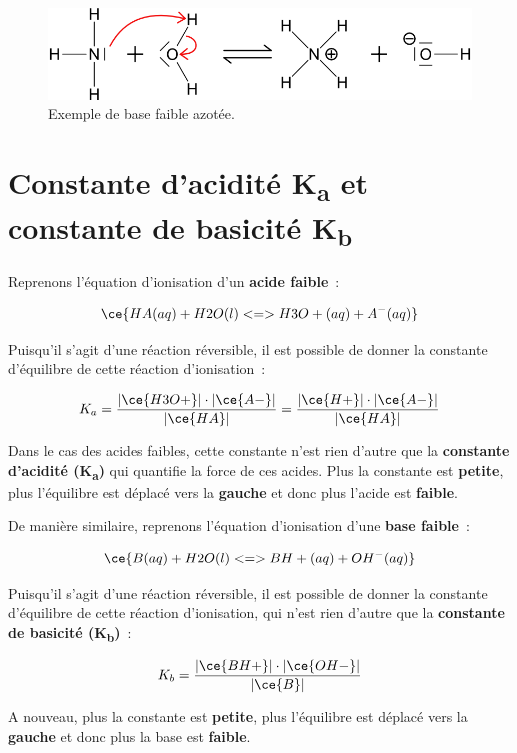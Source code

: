 \documentclass[
  11pt,
  a4paper,
  openany]{book}
\begin{document}
\begin{figure}

{\centering \includegraphics[width=0.5\linewidth]{images/acides-bases-3} 

}

\caption{Exemple de base faible azotée.}\label{fig:acides-bases-3}
\end{figure}

\section{\texorpdfstring{Constante d'acidité K\textsubscript{a} et constante de basicité K\textsubscript{b}}{Constante d'acidité Ka et constante de basicité Kb}}\label{constante-dacidituxe9-ka-et-constante-de-basicituxe9-kb}

Reprenons l'équation d'ionisation d'un \textbf{acide faible}~:

\[
\ce{HA(aq) + H2O(l) <=> H3O+(aq) + A^{-}(aq)}
\]

Puisqu'il s'agit d'une réaction réversible, il est possible de donner la constante d'équilibre de cette réaction d'ionisation~:

\[
K_a = \frac{|\ce{H3O+}| \cdot |\ce{A-}|}{|\ce{HA}|} =  \frac{|\ce{H+}| \cdot |\ce{A-}|}{|\ce{HA}|}
\]

Dans le cas des acides faibles, cette constante n'est rien d'autre que la \textbf{constante d'acidité (K\textsubscript{a})} qui quantifie la force de ces acides. Plus la constante est \textbf{petite}, plus l'équilibre est déplacé vers la \textbf{gauche} et donc plus l'acide est \textbf{faible}.

De manière similaire, reprenons l'équation d'ionisation d'une \textbf{base faible}~:

\[
\ce{B(aq) + H2O(l) <=> BH+(aq) + OH^{-}(aq)}
\]

Puisqu'il s'agit d'une réaction réversible, il est possible de donner la constante d'équilibre de cette réaction d'ionisation, qui n'est rien d'autre que la \textbf{constante de basicité (K\textsubscript{b})}~:

\[
K_b = \frac{|\ce{BH+}| \cdot |\ce{OH-}|}{|\ce{B}|}
\]

A nouveau, plus la constante est \textbf{petite}, plus l'équilibre est déplacé vers la \textbf{gauche} et donc plus la base est \textbf{faible}.
\end{document}
